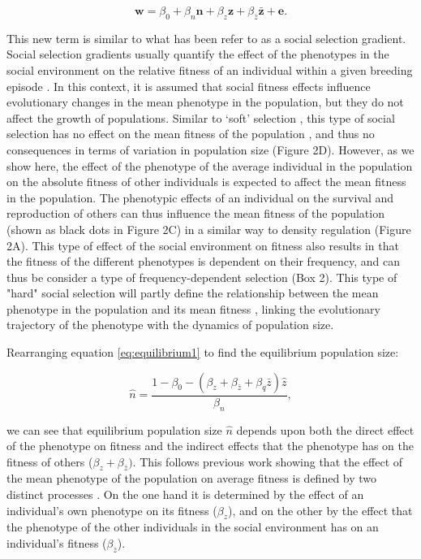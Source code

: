 \documentclass{article}
\begin{document}
\begin{equation} \label{eq: socialselection}
\bm{w}=\beta_{0} +\beta_{n} \bm{n} + \beta_{z} \bm{z}+ \beta_{\bar{z}} \bar{\bm{z}}+ \bm{e}.
\end{equation}

This new term is similar to what has been refer to as a social selection gradient. Social selection gradients usually quantify the effect of the phenotypes in the social environment on the relative fitness of an individual within a given breeding episode \citep{Wolf1999SocialSelection}. In this context, it is assumed that social fitness effects influence evolutionary changes in the mean phenotype in the population, but they do not affect the growth of populations. Similar to `soft' selection \citep{Wallace1975, Bell2021}, this type of social selection has no effect on the mean fitness of the population \citep{Goodnight1992}, and thus no consequences in terms of variation in population size (Figure 2D). However, as we show here, the effect of the phenotype of the average individual in the population on the absolute fitness of other individuals is expected to affect the mean fitness in the population. The phenotypic effects of an individual on the survival and reproduction of others can thus influence the mean fitness of the population (shown as black dots in Figure 2C) in a similar way to density regulation (Figure 2A). This type of effect of the social environment on fitness also results in that the fitness of the different phenotypes is dependent on their frequency, and can thus be consider a type of frequency-dependent selection (Box 2). This type of "hard" social selection will partly define the relationship between the mean phenotype in the population and its mean fitness \citep{Lande1976}, linking the evolutionary trajectory of the phenotype with the dynamics of population size.

\noindent Rearranging equation \ref{eq:equilibrium1} to find the equilibrium population size:

\begin{equation}
\hat{n} = \frac{1-\beta_{0} - (\beta_{z} + \beta_{\bar{z}} +  \beta_{q}\bar{z})\hat{z}}{\beta_{n}},
\end{equation}

\noindent we can see that equilibrium population size $\hat{n}$ depends upon both the direct effect of the phenotype on fitness and the indirect effects that the phenotype has on the fitness of others ($\beta_{z} + \beta_{\bar{z}})$. This follows previous work showing that the effect of the mean phenotype of the population on average fitness is defined by two distinct processes \citep{Engen2020, Lande2007, Lande1976}. On the one hand it is determined by the effect of an individual's own phenotype on its fitness ($\beta_{z}$), and on the other by the effect that the phenotype of the other individuals in the social environment has on an individual's fitness ($\beta_{\bar{z}}$).
\end{document}
